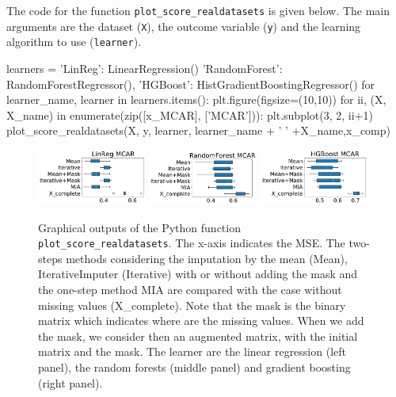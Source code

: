 \begin{appendix}
The code for the function \texttt{plot\_score\_realdatasets} is given below. The main arguments are the dataset (\texttt{X}), the outcome variable (\texttt{y}) and the learning algorithm to use (\texttt{learner}). 

\begin{example}
learners = {'LinReg': LinearRegression()
            'RandomForest': RandomForestRegressor(),
            'HGBoost': HistGradientBoostingRegressor()}
for learner_name, learner in learners.items():
    plt.figure(figsize=(10,10))
    for ii, (X, X_name) in enumerate(zip([x_MCAR], ['MCAR'])):
        plt.subplot(3, 2, ii+1)
        plot_score_realdatasets(X, y, learner, learner_name + ' ' +X_name,x_comp)
\end{example}




\begin{figure}
\includegraphics[width=0.32\textwidth]{figures/predict_appendix_LinReg.pdf}
\includegraphics[width=0.32\textwidth]{figures/predict_appendix_RandomForest.pdf}
\includegraphics[width=0.32\textwidth]{figures/predict_appendix_HGBoost.pdf}
\caption{\label{fig:howtopredict_Python} Graphical outputs of the {Python} function \texttt{plot\_score\_realdatasets}. The x-axis indicates the MSE. The two-steps methods considering the imputation by the mean (Mean), IterativeImputer (Iterative) with or without adding the mask and the one-step method MIA are compared with the case without missing values (X\_complete). Note that the mask is the binary matrix which indicates where are the missing values. When we add the mask, we consider then an augmented matrix, with the initial matrix and the mask. The learner are the linear regression (left panel), the random forests (middle panel) and gradient boosting (right panel).}
\end{figure}





\end{appendix}
